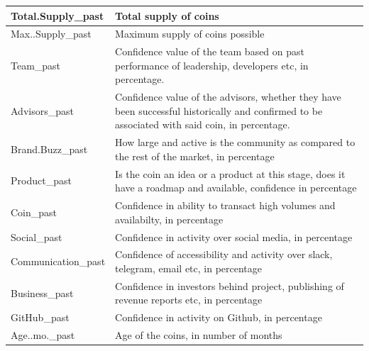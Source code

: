 \documentclass[11pt, english, letterpaper]{article}
\begin{document}
\begin{longtable}{|p{5cm}|p{10cm}|}
Total.Supply\_past     & Total supply of coins                                                                                                                           \\ \hline
Max..Supply\_past      & Maximum supply of coins possible                                                                                                                \\ \hline
Team\_past             & Confidence value of the team based on past performance of leadership, developers etc, in percentage.                                            \\ \hline
Advisors\_past         & Confidence value of the  advisors, whether they have been successful historically and confirmed to be associated with said coin, in percentage. \\ \hline
Brand.Buzz\_past       & How large and active is the community as compared to the rest of the market, in percentage                                                      \\ \hline
Product\_past          & Is the coin an idea or a product at this stage, does it have a roadmap and available, confidence in percentage                                  \\ \hline
Coin\_past             & Confidence in ability to transact high volumes and availabilty, in percentage                                                                   \\ \hline
Social\_past           & Confidence in activity over social media, in percentage                                                                                         \\ \hline
Communication\_past    & Confidence of accessibility and activity over slack, telegram, email etc, in percentage                                                         \\ \hline
Business\_past         & Confidence in investors behind project, publishing of revenue reports etc, in percentage                                                        \\ \hline
GitHub\_past           & Confidence in activity on Github, in percentage                                                                                                 \\ \hline
Age..mo.\_past         & Age of the coins, in number of months                                                                                                           \\ \hline

\end{longtable}
\end{document}
